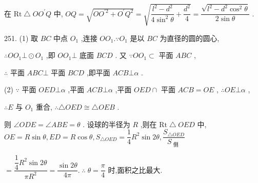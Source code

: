 在 $\mathrm{{Rt}} \bigtriangleup  {OO}^{\prime }Q$ 中, ${OQ} = \sqrt{O{O}^{\prime 2} + {O}^{\prime }{Q}^{2}} = \sqrt{\dfrac{{l}^{2} - {d}^{2}}{4{\sin }^{2}\theta } + \dfrac{{d}^{2}}{4}} = \dfrac{\sqrt{{l}^{2} - {d}^{2}{\cos }^{2}\theta }}{2\sin \theta }$ .

251. (1) 取 ${BC}$ 中点 ${O}_{1}$ ,连接 $O{O}_{1}.\because {O}_{1}$ 是以 ${BC}$ 为直径的圆的圆心,

$\therefore O{O}_{1} \bot   \odot  {O}_{1}$ ,即 $O{O}_{1} \bot$ 底面 ${BCD}$ . 又 $\because O{O}_{1} \subset$ 平面 ${ABC}$ ,

$\therefore$ 平面 ${ABC} \bot$ 平面 ${BCD}$ ,即平面 ${ACB} \bot  \alpha$ .

(2) $\because$ 平面 ${OED} \bot  \alpha$ ,平面 ${ACB} \bot  \alpha$ ,平面 ${OED} \cap$ 平面 ${ACB} = {OE}$ , $\therefore {OE} \bot  \alpha$ ,

$\therefore E$ 与 ${O}_{1}$ 重合, $\therefore \bigtriangleup {OED} \cong  \bigtriangleup {OEB}$ .

则 $\angle {ODE} = \angle {ABE} = \theta$ . 设球的半径为 $R$ ,则在 $\mathrm{{Rt}} \bigtriangleup  {OED}$ 中, ${OE} = R\sin \theta ,{ED} = R\cos \theta ,{S}_{\bigtriangleup {OED}} = \dfrac{1}{4}{R}^{2}\sin {2\theta },\dfrac{{S}_{\bigtriangleup {OED}}}{{S}_{\text{ 侧 }}}$

$= \dfrac{\dfrac{1}{4}{R}^{2}\sin {2\theta }}{\pi {R}^{2}} = \dfrac{\sin {2\theta }}{4\pi }.\;\therefore \;\theta  = \dfrac{\pi }{4}$ 时,面积之比最大.

